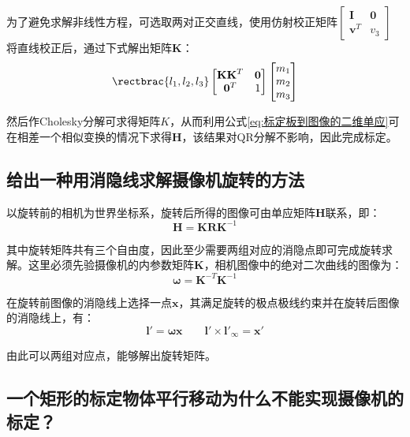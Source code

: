 \documentclass[11pt]{article}
\begin{document}
为了避免求解非线性方程，可选取两对正交直线，使用仿射校正矩阵$\begin{bmatrix}
  \mathbf{I}&\mathbf{0}\\
  \mathbf{v}^T&v_3
\end{bmatrix}$
将直线校正后，通过下式解出矩阵$\mathbf{K}$：
\begin{equation*}
  \rectbrac{l_1,l_2,l_3}\begin{bmatrix}
    \mathbf{KK}^T&\mathbf{0}\\
    \mathbf{0}^T&1
  \end{bmatrix}\begin{bmatrix}
    m_1\\
    m_2\\
    m_3
  \end{bmatrix}
\end{equation*}\par
然后作Cholesky分解可求得矩阵$K$，从而利用公式\ref{eq:标定板到图像的二维单应}可在相差一个相似变换的情况下求得$\mathbf{H}$，该结果对QR分解不影响，因此完成标定。
\subsection{给出一种用消隐线求解摄像机旋转的方法}
以旋转前的相机为世界坐标系，旋转后所得的图像可由单应矩阵$\mathbf{H}$联系，即：
\begin{equation*}
  \mathbf{H}=\mathbf{KRK}^{-1}
\end{equation*}\par
其中旋转矩阵共有三个自由度，因此至少需要两组对应的消隐点即可完成旋转求解。这里必须先验摄像机的内参数矩阵$\mathbf{K}$，相机图像中的绝对二次曲线的图像为：
\begin{equation*}
  \mathbold{\omega}=\mathbf{K}^{-T}\mathbf{K}^{-1}
\end{equation*}\par
在旋转前图像的消隐线上选择一点$\mathbf{x}$，其满足旋转的极点极线约束并在旋转后图像的消隐线上，有：
\begin{equation*}
  \mathbf{l}'=\mathbold{\omega x}\qquad\mathbf{l}'\times\mathbf{l'}_\infty=\mathbf{x'}
\end{equation*}\par
由此可以两组对应点，能够解出旋转矩阵。
\subsection{一个矩形的标定物体平行移动为什么不能实现摄像机的标定？}
\newpage
\printbibliography[heading=bibliography,title=参考文献]
\end{document}
